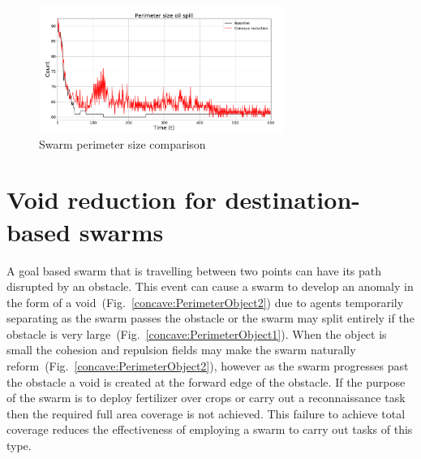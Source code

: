 \documentclass[preprint,12pt]{elsarticle}
\begin{document}
\begin{figure}
\begin{center}
\includegraphics[width=8cm]{figures/OilSpillPerimeter8060-1}
\end{center}
\caption{Swarm perimeter size comparison\label{concave:OilSpillPerimeter8060-1}}
\end{figure}

\section{Void reduction for destination-based swarms}\label{concave:mobileSwarm1}
A goal based swarm that is travelling between two points can have its path disrupted by an obstacle. This event can cause a swarm to develop an anomaly in the form of a void~(Fig.~\ref{concave:PerimeterObject2}) due to agents temporarily separating as the swarm passes the obstacle or the swarm may split entirely if the obstacle is very large~(Fig.~\ref{concave:PerimeterObject1}). 
When the object is small the cohesion and repulsion fields may make the swarm naturally reform~(Fig.~\ref{concave:PerimeterObject2}), however as the swarm progresses past the obstacle a void is created at the forward edge of the obstacle. If the purpose of the swarm is to deploy fertilizer over crops or carry out a reconnaissance task then the required full area coverage is not achieved. This failure to achieve total coverage reduces the effectiveness of employing a swarm to carry out tasks of this type.
\end{document}
